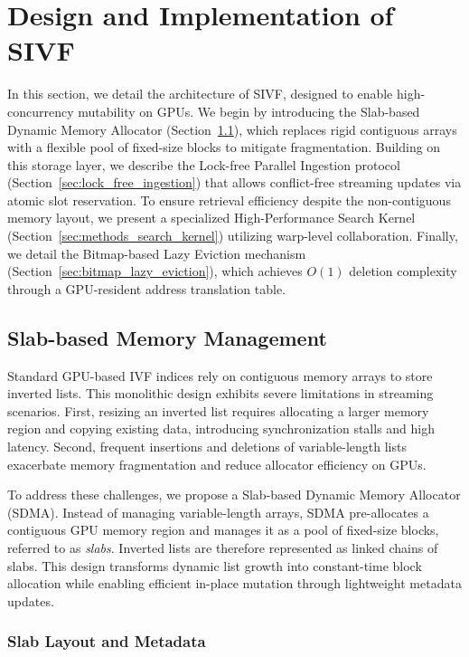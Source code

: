 \documentclass[sigconf,nonacm]{acmart}
\theoremstyle{plain}
\theoremstyle{definition}
\theoremstyle{remark}
\begin{document}
\section{Design and Implementation of SIVF}
\label{sec:design_implementation}

In this section, we detail the architecture of SIVF, designed to enable high-concurrency mutability on GPUs. We begin by introducing the Slab-based Dynamic Memory Allocator (Section~\ref{sec:slab_memory_management}), which replaces rigid contiguous arrays with a flexible pool of fixed-size blocks to mitigate fragmentation. Building on this storage layer, we describe the Lock-free Parallel Ingestion protocol (Section~\ref{sec:lock_free_ingestion}) that allows conflict-free streaming updates via atomic slot reservation. To ensure retrieval efficiency despite the non-contiguous memory layout, we present a specialized High-Performance Search Kernel (Section~\ref{sec:methods_search_kernel}) utilizing warp-level collaboration. Finally, we detail the Bitmap-based Lazy Eviction mechanism (Section~\ref{sec:bitmap_lazy_eviction}), which achieves $O(1)$ deletion complexity through a GPU-resident address translation table.

\subsection{Slab-based Memory Management}
\label{sec:slab_memory_management}

Standard GPU-based IVF indices rely on contiguous memory arrays to store inverted lists. This monolithic design exhibits severe limitations in streaming scenarios. First, resizing an inverted list requires allocating a larger memory region and copying existing data, introducing synchronization stalls and high latency. Second, frequent insertions and deletions of variable-length lists exacerbate memory fragmentation and reduce allocator efficiency on GPUs.

To address these challenges, we propose a Slab-based Dynamic Memory Allocator (SDMA). Instead of managing variable-length arrays, SDMA pre-allocates a contiguous GPU memory region and manages it as a pool of fixed-size blocks, referred to as \emph{slabs}. Inverted lists are therefore represented as linked chains of slabs. This design transforms dynamic list growth into constant-time block allocation while enabling efficient in-place mutation through lightweight metadata updates.

\subsubsection{Slab Layout and Metadata}
\end{document}
